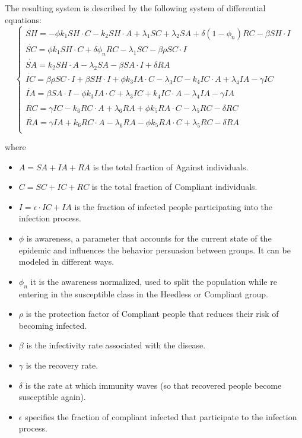 The resulting system is described by the following system of differential equations: 
\begin{equation}
	\begin{cases}
		\dot{SH} = - \phi k_1 SH \cdot C - k_2 SH \cdot A + \lambda_1 SC + \lambda_2 SA + \delta(1-\phi_n)RC - \beta SH \cdot I\\
		\dot{SC} = \phi k_1 SH \cdot C + \delta \phi_n RC - \lambda_1 SC - \beta \rho SC \cdot I  \\
		\dot{SA} = k_2 SH \cdot A - \lambda_2 SA - \beta SA \cdot I + \delta RA \\
		\dot{IC} = \beta \rho SC \cdot I + \beta SH \cdot I + \phi k_3 IA \cdot C - \lambda_3 IC -  k_4 IC \cdot A + \lambda_4 IA - \gamma IC\\
		 \dot{IA} = \beta SA \cdot I - \phi k_3 IA \cdot C + \lambda_3 IC + k_4 IC \cdot A - \lambda_4 IA - \gamma IA\\
		 \dot{RC} = \gamma IC - k_6 RC \cdot A + \lambda_6 RA + \phi k_5 RA \cdot C - \lambda_5 RC - \delta RC\\
		 \dot{RA} = \gamma IA + k_6 RC \cdot A - \lambda_6 RA - \phi k_5 RA \cdot C + \lambda_5 RC - \delta RA\\
	\end{cases}
	\label{eq:epi_behavioural_eq}
\end{equation}

where
\begin{itemize}
	\item $A = SA + IA + RA$ is the total fraction of Against individuals.
	\item $C = SC + IC + RC$  is the total fraction of Compliant individuals.
	\item $I = \epsilon \cdot IC + IA$ is the fraction of infected people participating into the infection process.
	\item $\phi$ is awareness, a parameter that accounts for the current state of the epidemic and influences the behavior persuasion between groups. It can be modeled in different ways. 
	\item $\phi_n$ it is the awareness normalized, used to split the population while re entering in the susceptible class in the Heedless or Compliant group. 
	\item $\rho$ is the protection factor of Compliant people that reduces their risk of becoming infected.
	\item $\beta$ is the infectivity rate associated with the disease.
	\item $\gamma$ is the recovery rate.
	\item $\delta$ is the rate at which immunity waves (so that recovered people become susceptible again).
	\item $\epsilon$ specifies the fraction of compliant infected that participate to the infection process.
\end{itemize}

